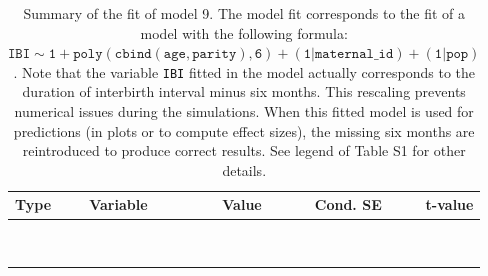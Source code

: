 \begin{table}

\caption{\label{tab:tab9}Summary of the fit of model 9. The model fit corresponds to the fit of a model with the following formula: {\small$\mathtt{IBI \sim 1 + poly(cbind(age, parity), 6) + (1 | maternal\_id) + (1 | pop)}$}. Note that the variable \texttt{IBI} fitted in the model actually corresponds to the duration of interbirth interval minus six months. This rescaling prevents numerical issues during the simulations. When this fitted model is used for predictions (in plots or to compute effect sizes), the missing six months are reintroduced to produce correct results. See legend of Table S1 for other details.}
\centering
\fontsize{8}{10}\selectfont
\begin{tabular}[t]{>{\raggedright\arraybackslash}p{3cm}>{\raggedright\arraybackslash}p{5cm}rrr}
\toprule
Type & Variable & Value & Cond. SE & t-value\\
\midrule
\cellcolor{gray!6}{fixed effects} & \cellcolor{gray!6}{$\beta_1$} & \cellcolor{gray!6}{3.44} & \cellcolor{gray!6}{0.0578} & \cellcolor{gray!6}{59.6}\\
\cellcolor{gray!6}{} & \cellcolor{gray!6}{$\beta_{\mathtt{age}}$} & \cellcolor{gray!6}{-63.4} & \cellcolor{gray!6}{21.9} & \cellcolor{gray!6}{-2.9}\\
\cellcolor{gray!6}{} & \cellcolor{gray!6}{$\beta_{\mathtt{age}^2}$} & \cellcolor{gray!6}{39.5} & \cellcolor{gray!6}{19.6} & \cellcolor{gray!6}{2.01}\\
\cellcolor{gray!6}{} & \cellcolor{gray!6}{$\beta_{\mathtt{age}^3}$} & \cellcolor{gray!6}{-31.2} & \cellcolor{gray!6}{13} & \cellcolor{gray!6}{-2.4}\\
\cellcolor{gray!6}{} & \cellcolor{gray!6}{$\beta_{\mathtt{age}^4}$} & \cellcolor{gray!6}{14.9} & \cellcolor{gray!6}{6.31} & \cellcolor{gray!6}{2.37}\\
\cellcolor{gray!6}{} & \cellcolor{gray!6}{$\beta_{\mathtt{age}^5}$} & \cellcolor{gray!6}{-4.98} & \cellcolor{gray!6}{2.42} & \cellcolor{gray!6}{-2.06}\\
\cellcolor{gray!6}{} & \cellcolor{gray!6}{$\beta_{\mathtt{age}^6}$} & \cellcolor{gray!6}{4.01} & \cellcolor{gray!6}{1.01} & \cellcolor{gray!6}{3.95}\\
\cellcolor{gray!6}{} & \cellcolor{gray!6}{$\beta_{\mathtt{parity}}$} & \cellcolor{gray!6}{120} & \cellcolor{gray!6}{40.7} & \cellcolor{gray!6}{2.96}\\
\cellcolor{gray!6}{} & \cellcolor{gray!6}{$\beta_{\mathtt{age}\times\mathtt{parity}}$} & \cellcolor{gray!6}{-29655} & \cellcolor{gray!6}{15604} & \cellcolor{gray!6}{-1.9}\\

\end{tabular}
\end{table}
